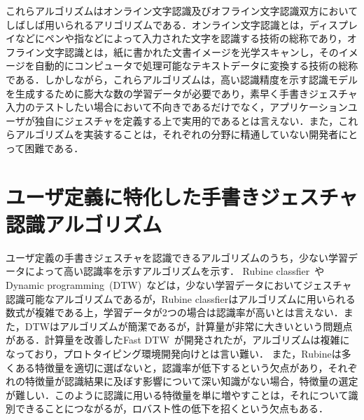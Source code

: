 これらアルゴリズムはオンライン文字認識及びオフライン文字認識双方においてしばしば用いられるアリゴリズムである．オンライン文字認識とは，ディスプレイなどにペンや指などによって入力された文字を認識する技術の総称であり，オフライン文字認識とは，紙に書かれた文書イメージを光学スキャンし，そのイメージを自動的にコンピュータで処理可能なテキストデータに変換する技術の総称である．しかしながら，これらアルゴリズムは，高い認識精度を示す認識モデルを生成するために膨大な数の学習データが必要であり，素早く手書きジェスチャ入力のテストしたい場合において不向きであるだけでなく，アプリケーションユーザが独自にジェスチャを定義する上で実用的であるとは言えない．また，これらアルゴリズムを実装することは，それぞれの分野に精通していない開発者にとって困難である．

\section{ユーザ定義に特化した手書きジェスチャ認識アルゴリズム}
ユーザ定義の手書きジェスチャを認識できるアルゴリズムのうち，少ない学習データによって高い認識率を示すアルゴリズムを示す．
Rubine classfier~\cite{Rubine:1991:SGE:122718.122753}やDynamic programming~(DTW)~\cite{Tappert:1982:CSR:1664966.1664979}などは，少ない学習データにおいてジェスチャ認識可能なアルゴリズムであるが，Rubine classfierはアルゴリズムに用いられる数式が複雑である上，学習データが2つの場合は認識率が高いとは言えない．また，DTWはアルゴリズムが簡潔であるが，計算量が非常に大きいという問題点がある．計算量を改善したFast DTW~\cite{Salvador:2007:TAD:1367985.1367993}が開発されたが，アルゴリズムは複雑になっており，プロトタイピング環境開発向けとは言い難い．
また，Rubineは多くある特徴量を適切に選ばないと，認識率が低下するという欠点があり，それぞれの特徴量が認識結果に及ぼす影響について深い知識がない場合，特徴量の選定が難しい．このように認識に用いる特徴量を単に増やすことは，それについて識別できることにつながるが，ロバスト性の低下を招くという欠点もある．

